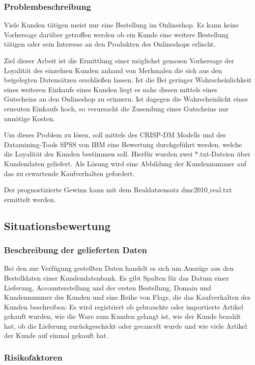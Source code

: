\documentclass[a4paper,12pt]{article}
\begin{document}
\subsubsection{Problembeschreibung}
Viele Kunden tätigen meist nur eine Bestellung im Onlineshop. Es kann keine Vorhersage darüber getroffen werden ob ein Kunde eine weitere Bestellung tätigen oder sein Interesse an den Produkten des Onlineshops erlischt.
\par
Ziel dieser Arbeit ist die Ermittlung einer möglichst genauen Vorhersage der Loyalität des einzelnen Kunden anhand von Merkmalen die sich aus den beigelegten Datensätzen erschließen lassen. Ist die Bei geringer Wahrscheinlichkeit eines weiteren Einkaufs eines Kunden liegt es nahe diesen mittels eines Gutscheins an den Onlineshop zu erinnern. Ist dagegen die Wahrscheinlicht eines erneuten Einkaufs hoch, so verursacht die Zusendung eines Gutscheins nur unnötige Kosten.  
\par
Um dieses Problem zu lösen, soll mittels des CRISP-DM Modells \cite{crisp}
und des Datamining-Tools SPSS von IBM eine Bewertung durchgeführt werden, welche die
Loyalität des Kunden bestimmen soll. Hierfür wurden zwei *.txt-Dateien über Kundendaten geliefert.
Als Lösung wird eine Abbildung der Kundennummer auf das zu erwartende Kaufverhalten gefordert. 

Der prognostizierte Gewinn kann mit dem Realdatzensatz dmc2010$\_$real.txt ermittelt werden.
\subsection{Situationsbewertung}

\subsubsection{Beschreibung der gelieferten Daten}
Bei den zur Verfügung gestellten Daten  handelt es sich um Auszüge aus den Bestelldaten einer Kundendatenbank.
Es gibt Spalten für das Datum einer Lieferung, Accounterstellung und der
ersten Bestellung, Domain und Kundennummer des Kunden und eine Reihe von Flags, die das Kaufverhalten des Kunden beschreiben:
Es wird registriert ob gebrauchte oder importierte Artikel gekauft wurden, wie die Ware zum Kunden gelangt ist, wie der Kunde bezahlt hat, ob die Lieferung zurückgeschickt oder gecancelt wurde und wie viele Artikel der Kunde auf einmal gekauft hat.

\subsubsection{Risikofaktoren}
\end{document}
